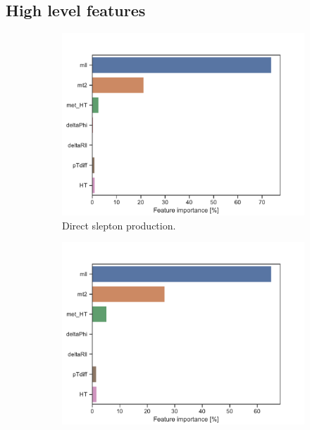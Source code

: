 \subsection{High level features}
\begin{figure}[H]
    \centering
    \begin{subfigure}[t!]{0.49\textwidth}
        \includegraphics[width = \textwidth]{Figures/SlepSlep/ML/BDT/High_level/High/featureImportance.pdf}
        \caption{Direct slepton production.}
        \label{fig:}
    \end{subfigure}
    \begin{subfigure}[t!]{0.49\textwidth}
        \includegraphics[width = \textwidth]{Figures/SlepSnu/BDT/High_level/High/featureImportance.pdf}

\end{subfigure}
\end{figure}

